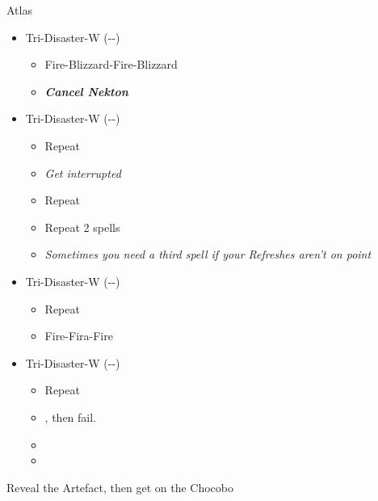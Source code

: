 \renewcommand{\first}{[1]Aggression-X(\com-\com-\nek)}
\renewcommand{\second}{[2] Aggression-X (\rav-\com-\nek)}
\renewcommand{\third}{[3] Relentless Assault-W (\com-\rav-\nek)}
\renewcommand{\fourth}{[4] Patient Probing-W (\sen-\sen-\nek)}
\renewcommand{\fifth}{[5] Tri-Disaster-W (\rav-\rav-\nek)}
\renewcommand{\sixth}{[6] Tri-Disaster-W (\rav-\rav-\nek)}
\begin{battle}{Atlas}
	\begin{itemize}
		\item \sixth
		      \begin{itemize}
			      \item Fire-Blizzard-Fire-Blizzard
			      \item \textbf{\textit{Cancel Nekton}}
		      \end{itemize}
		\item \fifth
		      \begin{itemize}
			      \item Repeat
			      \item \textit{Get interrupted}
			      \item Repeat
			      \item Repeat 2 spells \stagger
			      \item \textit{Sometimes you need a third spell if your Refreshes aren't on point}
		      \end{itemize}
		\item \sixth
		      \begin{itemize}
			      \item Repeat
			      \item Fire-Fira-Fire
		      \end{itemize}
		\item \fifth
		      \begin{itemize}
			      \item Repeat
			      \item \QTE{\rightc}, then fail.
			      \item \QTE{\x}
			      \item \QTEEEE{\leftc}{\x}{\leftc}{\x}
		      \end{itemize}
	\end{itemize}
\end{battle}

Reveal the Artefact, then get on the Chocobo


\newline
